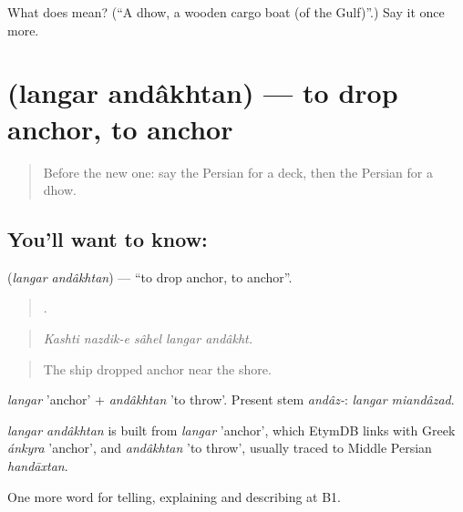 \begin{tcolorbox}[breakable,colback=teal!4,colframe=teal!35!black,title={Before you move on}]
What does  mean? (\textquotedblleft{}A dhow, a wooden cargo boat (of the Gulf)\textquotedblright{}.) Say it once more.
\end{tcolorbox}
\section[\texorpdfstring{\fa{لنگر} \fa{انداختن} (langar andâkhtan)}{لنگر انداختن (langar andâkhtan)}]{  (langar andâkhtan) — to drop anchor, to anchor}

\label{lesson:FA-C436-langar-andakhtan}



\begin{quote}
Before the new one: say the Persian for a deck, then the Persian for a dhow.
\end{quote}

\subsection*{You'll want to know:  }
\textbf{ } (\emph{langar andâkhtan}) — \textquotedblleft{}to drop anchor, to anchor\textquotedblright{}.

\begin{quote}
    .
\end{quote}

\begin{quote}
\emph{Kashti nazdik-e sâhel langar andâkht.}
\end{quote}

\begin{quote}
The ship dropped anchor near the shore.
\end{quote}

\emph{langar} 'anchor' + \emph{andâkhtan} 'to throw'. Present stem \emph{andâz-}: \emph{langar miandâzad}.

\begin{cousinweb}
\emph{langar andâkhtan} is built from \emph{langar} 'anchor', which EtymDB links with Greek \emph{ánkyra} 'anchor', and \emph{andâkhtan} 'to throw', usually traced to Middle Persian \emph{handāxtan}.
\end{cousinweb}

\begin{grammarlens}[title={What you've built}]
One more word for telling, explaining and describing at B1.
\end{grammarlens}

